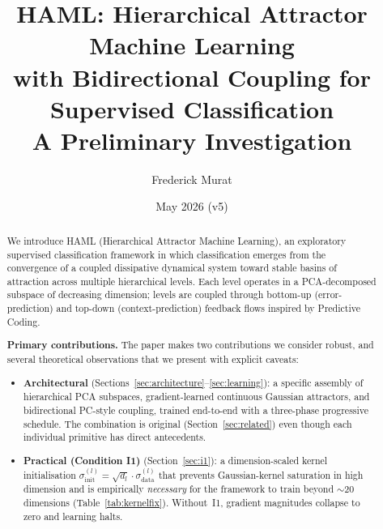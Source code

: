 \documentclass[11pt,a4paper]{article}
\title{HAML: Hierarchical Attractor Machine Learning\\
with Bidirectional Coupling for Supervised Classification\\[0.5em]
\large A Preliminary Investigation}
\author{Frederick Murat}
\affil{Independent Researcher \\ \texttt{contact via GitHub: ikobootloader}}
\date{May 2026 (v5)}
\begin{document}
\maketitle

\begin{abstract}
We introduce HAML (Hierarchical Attractor Machine Learning), an exploratory supervised
classification framework in which classification emerges from the convergence of a coupled
dissipative dynamical system toward stable basins of attraction across multiple
hierarchical levels. Each level operates in a PCA-decomposed subspace of decreasing
dimension; levels are coupled through bottom-up (error-prediction) and top-down
(context-prediction) feedback flows inspired by Predictive Coding.

\textbf{Primary contributions.}
The paper makes two contributions we consider robust, and several theoretical
observations that we present with explicit caveats:
\begin{itemize}
  \item \textbf{Architectural} (Sections~\ref{sec:architecture}--\ref{sec:learning}): a
        specific assembly of hierarchical PCA subspaces, gradient-learned continuous
        Gaussian attractors, and bidirectional PC-style coupling, trained end-to-end
        with a three-phase progressive schedule. The combination is original
        (Section~\ref{sec:related}) even though each individual primitive has direct
        antecedents.
  \item \textbf{Practical (Condition I1)} (Section~\ref{sec:i1}): a dimension-scaled
        kernel initialisation $\sigma_{\mathrm{init}}^{(l)} = \sqrt{d_l}\cdot\sigma_{\mathrm{data}}^{(l)}$
        that prevents Gaussian-kernel saturation in high dimension and is empirically
        \emph{necessary} for the framework to train beyond $\sim$20 dimensions
        (Table~\ref{tab:kernelfix}). Without~I1, gradient magnitudes collapse to zero
        and learning halts.
\end{itemize}


\end{abstract}
\end{document}
